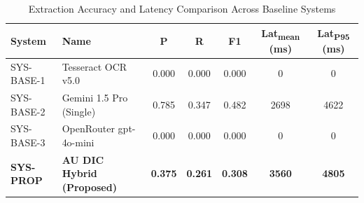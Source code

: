 \begin{table}[!t]
\renewcommand{\arraystretch}{1.3}
\caption{Extraction Accuracy and Latency Comparison Across Baseline Systems}
\label{tab:accuracy_comparison}
\centering
\begin{tabular}{llccccc}
\hline
\bfseries System & \bfseries Name & \bfseries P & \bfseries R & \bfseries F1 & \bfseries Lat\textsubscript{mean} (ms) & \bfseries Lat\textsubscript{P95} (ms) \\
\hline
SYS-BASE-1 & Tesseract OCR v5.0 & 0.000 & 0.000 & 0.000 & 0 & 0 \\
SYS-BASE-2 & Gemini 1.5 Pro (Single) & 0.785 & 0.347 & 0.482 & 2698 & 4622 \\
SYS-BASE-3 & OpenRouter gpt-4o-mini & 0.000 & 0.000 & 0.000 & 0 & 0 \\
\textbf{SYS-PROP} & \textbf{AU DIC Hybrid (Proposed)} & \textbf{0.375} & \textbf{0.261} & \textbf{0.308} & \textbf{3560} & \textbf{4805} \\
\hline
\end{tabular}
\end{table}